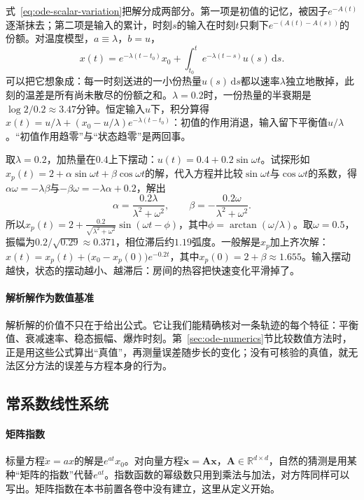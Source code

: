 式~\eqref{eq:ode-scalar-variation}把解分成两部分。第一项是初值的记忆，被因子$e^{-A(t)}$逐渐抹去；第二项是输入的累计，时刻$s$的输入在时刻$t$只剩下$e^{-(A(t)-A(s))}$的份额。对温度模型，$a\equiv\lambda$，$b=u$，
\[
  x(t)=e^{-\lambda(t-t_0)}x_0+\int_{t_0}^te^{-\lambda(t-s)}u(s)\,\mathrm ds.
\]
可以把它想象成：每一时刻送进的一小份热量$u(s)\,\mathrm ds$都以速率$\lambda$独立地散掉，此刻的温差是所有尚未散尽的份额之和。$\lambda=0.2$时，一份热量的半衰期是$\log2/0.2\approx3.47$分钟。恒定输入$u$下，积分算得$x(t)=u/\lambda+(x_0-u/\lambda)e^{-\lambda(t-t_0)}$：初值的作用消退，输入留下平衡值$u/\lambda$。“初值作用趋零”与“状态趋零”是两回事。

\begin{example}[周期加热的稳态响应]
  \label{ex:ode-periodic-heating}
  取$\lambda=0.2$，加热量在$0.4$上下摆动：$u(t)=0.4+0.2\sin\omega t$。试探形如$x_p(t)=2+\alpha\sin\omega t+\beta\cos\omega t$的解，代入方程并比较$\sin\omega t$与$\cos\omega t$的系数，得$\alpha\omega=-\lambda\beta$与$-\beta\omega=-\lambda\alpha+0.2$，解出
  \[
    \alpha=\frac{0.2\lambda}{\lambda^2+\omega^2},\qquad\beta=-\frac{0.2\omega}{\lambda^2+\omega^2}.
  \]
  所以$x_p(t)=2+\frac{0.2}{\sqrt{\lambda^2+\omega^2}}\sin(\omega t-\phi)$，其中$\phi=\arctan(\omega/\lambda)$。取$\omega=0.5$，振幅为$0.2/\sqrt{0.29}\approx0.371$，相位滞后约$1.19$弧度。一般解是$x_p$加上齐次解：$x(t)=x_p(t)+\bigl(x_0-x_p(0)\bigr)e^{-0.2t}$，其中$x_p(0)=2+\beta\approx1.655$。输入摆动越快，状态的摆动越小、越滞后：房间的热容把快速变化平滑掉了。
\end{example}

\paragraph{解析解作为数值基准}
解析解的价值不只在于给出公式。它让我们能精确核对一条轨迹的每个特征：平衡值、衰减速率、稳态振幅、爆炸时刻。第~\ref{sec:ode-numerics}节比较数值方法时，正是用这些公式算出“真值”，再测量误差随步长的变化；没有可核验的真值，就无法区分方法的误差与方程本身的行为。

\subsection{常系数线性系统}
\label{sec:ode-constant-linear}

\paragraph{矩阵指数}
标量方程$\dot x=ax$的解是$e^{at}x_0$。对向量方程$\dot{\bm x}=\bm A\bm x$，$\bm A\in\mathbb R^{d\times d}$，自然的猜测是用某种“矩阵的指数”代替$e^{at}$。指数函数的幂级数只用到乘法与加法，对方阵同样可以写出。矩阵指数在本书前置各卷中没有建立，这里从定义开始。

